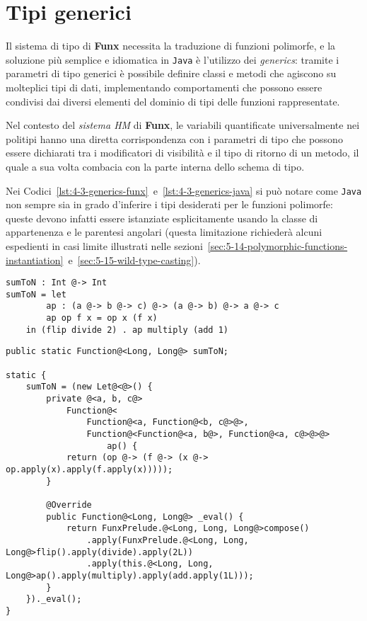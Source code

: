 \section{Tipi generici}
\label{sec:4-3-generics}

Il sistema di tipo di \textbf{Funx} necessita la traduzione di funzioni polimorfe,
e la soluzione più semplice e idiomatica in \texttt{Java} è l'utilizzo dei \textit{generics}:
tramite i parametri di tipo generici è possibile definire classi e metodi che agiscono su molteplici tipi di dati,
implementando comportamenti che possono essere condivisi dai diversi elementi del dominio di tipi delle funzioni rappresentate.


Nel contesto del \textit{sistema HM} di \textbf{Funx}, le variabili quantificate universalmente nei politipi
hanno una diretta corrispondenza con i parametri di tipo che possono essere dichiarati tra i modificatori di visibilità
e il tipo di ritorno di un metodo, il quale a sua volta combacia con la parte interna dello schema di tipo.


Nei Codici~\ref{lst:4-3-generics-funx}~e~\ref{lst:4-3-generics-java} si può notare come \texttt{Java} non sempre sia in grado
d'inferire i tipi desiderati per le funzioni polimorfe: queste devono infatti essere istanziate esplicitamente
usando la classe di appartenenza e le parentesi angolari (questa limitazione richiederà alcuni espedienti in casi limite
illustrati nelle sezioni~\ref{sec:5-14-polymorphic-functions-instantiation}~e~\ref{sec:5-15-wild-type-casting}).

\vspace{4mm}
\begin{lstlisting}[caption={Scrittura e utilizzo di funzioni polimorfe in \textbf{Funx}}, style=funxCode, label={lst:4-3-generics-funx}]
sumToN : Int @-> Int
sumToN = let
        ap : (a @-> b @-> c) @-> (a @-> b) @-> a @-> c
        ap op f x = op x (f x)
    in (flip divide 2) . ap multiply (add 1)
\end{lstlisting}
\vspace{4mm}
\begin{lstlisting}[caption={Corrispondenti proprietà e metodi \texttt{Java}}, style=javaCode, label={lst:4-3-generics-java}]
public static Function@<Long, Long@> sumToN;

static {
    sumToN = (new Let@<@>() {
        private @<a, b, c@>
            Function@<
                Function@<a, Function@<b, c@>@>,
                Function@<Function@<a, b@>, Function@<a, c@>@>@>
                    ap() {
            return (op @-> (f @-> (x @-> op.apply(x).apply(f.apply(x)))));
        }

        @Override
        public Function@<Long, Long@> _eval() {
            return FunxPrelude.@<Long, Long, Long@>compose()
                .apply(FunxPrelude.@<Long, Long, Long@>flip().apply(divide).apply(2L))
                .apply(this.@<Long, Long, Long@>ap().apply(multiply).apply(add.apply(1L)));
        }
    })._eval();
}  
\end{lstlisting}
